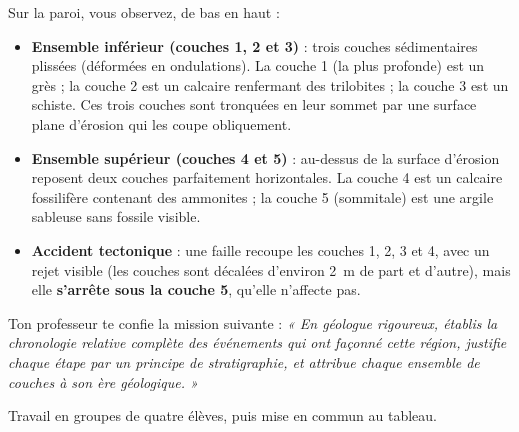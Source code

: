 \documentclass[11pt]{article}
\newcommand{\cle}[1]{{\popxbold\color{popdark}#1}}
\newcounter{popsec}
\newcounter{popsub}
\newcommand{\courssub}[1]{%
  \stepcounter{popsub}%
  \par\vspace{9pt}\noindent{\popxbold\fontsize{11.5}{13}\selectfont\color{popink}{\color{poporange}\thepopsec.\thepopsub}\hspace{6pt}#1}\par\nopagebreak\vspace{4pt}
}
\begin{document}
Sur la paroi, vous observez, de bas en haut :

\begin{itemize}
\item \textbf{Ensemble inférieur (couches 1, 2 et 3)} : trois couches sédimentaires \cle{plissées} (déformées en ondulations). La couche 1 (la plus profonde) est un grès ; la couche 2 est un calcaire renfermant des \cle{trilobites} ; la couche 3 est un schiste. Ces trois couches sont \cle{tronquées} en leur sommet par une surface plane d'\cle{érosion} qui les coupe obliquement.
\item \textbf{Ensemble supérieur (couches 4 et 5)} : au-dessus de la surface d'érosion reposent deux couches parfaitement \cle{horizontales}. La couche 4 est un calcaire fossilifère contenant des \cle{ammonites} ; la couche 5 (sommitale) est une argile sableuse sans fossile visible.
\item \textbf{Accident tectonique} : une \cle{faille} recoupe les couches 1, 2, 3 et 4, avec un rejet visible (les couches sont décalées d'environ \SI{2}{m} de part et d'autre), mais elle \textbf{s'arrête sous la couche 5}, qu'elle n'affecte pas.
\end{itemize}

Ton professeur te confie la mission suivante : \emph{« En géologue rigoureux, établis la chronologie relative complète des événements qui ont façonné cette région, justifie chaque étape par un principe de stratigraphie, et attribue chaque ensemble de couches à son ère géologique. »}

\courssub{Consignes}

Travail en groupes de quatre élèves, puis mise en commun au tableau.
\end{document}
